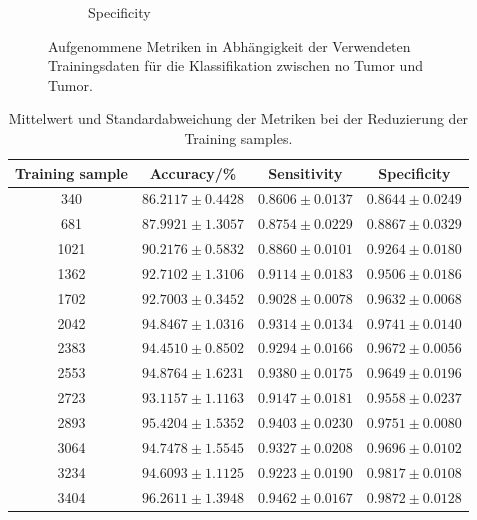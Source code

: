\begin{figure}[H]
\begin{subfigure}[b]{0.48\textwidth}
    \caption{Specificity}
    \label{fig:reduzierung_specificity}
  \end{subfigure}
  \caption{Aufgenommene Metriken in Abhängigkeit der Verwendeten Trainingsdaten für die Klassifikation zwischen no Tumor und Tumor.}
  \label{fig:reduzierung_trainingsdaten}
\end{figure}
\begin{table}[H]
    \centering
    {\small
        \begin{tabular}{cccc}
            \toprule
            Training sample & Accuracy/\% & Sensitivity & Specificity\\
            \midrule
            340  & $86.2117 \pm 0.4428$ & $0.8606 \pm 0.0137 $ & $0.8644 \pm 0.0249$\\
            681  & $87.9921 \pm 1.3057$ & $0.8754 \pm 0.0229 $ & $0.8867 \pm 0.0329$\\
            1021 & $90.2176 \pm 0.5832$ & $0.8860 \pm 0.0101 $ & $0.9264 \pm 0.0180$\\
            1362 & $92.7102 \pm 1.3106$ & $0.9114 \pm 0.0183 $ & $0.9506 \pm 0.0186$\\
            1702 & $92.7003 \pm 0.3452$ & $0.9028 \pm 0.0078 $ & $0.9632 \pm 0.0068$\\
            2042 & $94.8467 \pm 1.0316$ & $0.9314 \pm 0.0134 $ & $0.9741 \pm 0.0140$\\
            2383 & $94.4510 \pm 0.8502$ & $0.9294 \pm 0.0166 $ & $0.9672 \pm 0.0056$\\
            2553 & $94.8764 \pm 1.6231$ & $0.9380 \pm 0.0175 $ & $0.9649 \pm 0.0196$\\
            2723 & $93.1157 \pm 1.1163$ & $0.9147 \pm 0.0181 $ & $0.9558 \pm 0.0237$\\
            2893 & $95.4204 \pm 1.5352$ & $0.9403 \pm 0.0230 $ & $0.9751 \pm 0.0080$\\
            3064 & $94.7478 \pm 1.5545$ & $0.9327 \pm 0.0208 $ & $0.9696 \pm 0.0102$\\
            3234 & $94.6093 \pm 1.1125$ & $0.9223 \pm 0.0190 $ & $0.9817 \pm 0.0108$\\
            3404 & $96.2611 \pm 1.3948$ & $0.9462 \pm 0.0167 $ & $0.9872 \pm 0.0128$\\ 
            \bottomrule
        \end{tabular}
    }
  \caption{Mittelwert und Standardabweichung der Metriken bei der Reduzierung der Training samples.}
  \label{tab:reduzierung_trainingsdaten}
\end{table}


